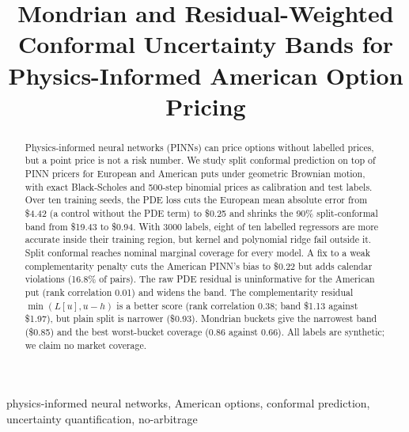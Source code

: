 \documentclass[conference]{IEEEtran}
\newcommand{\usd}{\$}
\begin{document}
\title{Mondrian and Residual-Weighted Conformal Uncertainty Bands for Physics-Informed American Option Pricing}

\author{
}

\maketitle

\begin{abstract}
Physics-informed neural networks (PINNs) can price options without labelled prices, but a point price is not a risk number. We study split conformal prediction on top of PINN pricers for European and American puts under geometric Brownian motion, with exact Black-Scholes and 500-step binomial prices as calibration and test labels. Over ten training seeds, the PDE loss cuts the European mean absolute error from \usd 4.42 (a control without the PDE term) to \usd 0.25 and shrinks the 90\% split-conformal band from \usd 19.43 to \usd 0.94. With 3000 labels, eight of ten labelled regressors are more accurate inside their training region, but kernel and polynomial ridge fail outside it. Split conformal reaches nominal marginal coverage for every model. A fix to a weak complementarity penalty cuts the American PINN's bias to \usd 0.22 but adds calendar violations (16.8\% of pairs). The raw PDE residual is uninformative for the American put (rank correlation 0.01) and widens the band. The complementarity residual $\min(L[u],u-h)$ is a better score (rank correlation 0.38; band \usd 1.13 against \usd 1.97), but plain split is narrower (\usd 0.93). Mondrian buckets give the narrowest band (\usd 0.85) and the best worst-bucket coverage (0.86 against 0.66). All labels are synthetic; we claim no market coverage.
\end{abstract}

\begin{IEEEkeywords}
physics-informed neural networks, American options, conformal prediction, uncertainty quantification, no-arbitrage
\end{IEEEkeywords}
\end{document}
